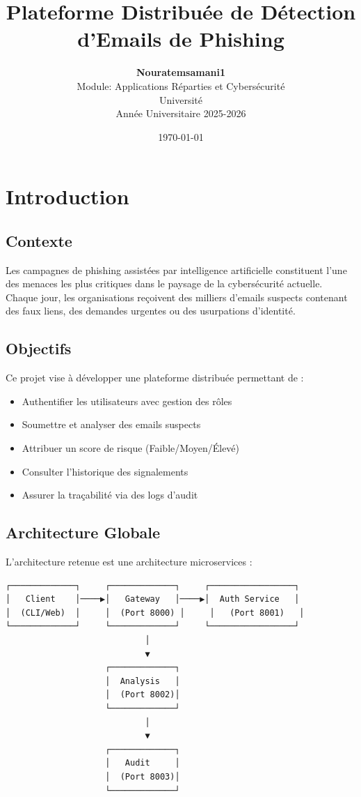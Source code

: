 \documentclass[12pt,a4paper]{article}
\title{
    \vspace{2cm}
    \Huge\textbf{Plateforme Distribuée de Détection}\\ 
    \Huge\textbf{d'Emails de Phishing}
    \vspace{0.5cm}
}
\author{
    \large\textbf{Nouratemsamani1}\\
    \large Module: Applications Réparties et Cybersécurité\\
    \vspace{0.5cm}
    \large Université\\
    \large Année Universitaire 2025-2026
}
\date{\today}
\begin{document}
\maketitle
\thispagestyle{empty}

\newpage
\tableofcontents
\thispagestyle{empty}

\newpage
\setcounter{page}{1}

\section{Introduction}

\subsection{Contexte}
Les campagnes de phishing assistées par intelligence artificielle constituent l'une des menaces les plus critiques dans le paysage de la cybersécurité actuelle. Chaque jour, les organisations reçoivent des milliers d'emails suspects contenant des faux liens, des demandes urgentes ou des usurpations d'identité.

\subsection{Objectifs}
Ce projet vise à développer une plateforme distribuée permettant de :
\begin{itemize}
    \item Authentifier les utilisateurs avec gestion des rôles
    \item Soumettre et analyser des emails suspects
    \item Attribuer un score de risque (Faible/Moyen/Élevé)
    \item Consulter l'historique des signalements
    \item Assurer la traçabilité via des logs d'audit
\end{itemize}

\subsection{Architecture Globale}
L'architecture retenue est une architecture microservices :

\begin{verbatim}
┌─────────────┐     ┌─────────────┐     ┌─────────────────┐
│   Client    │────▶│   Gateway   │────▶│  Auth Service   │
│  (CLI/Web)  │     │  (Port 8000) │     │   (Port 8001)   │
└─────────────┘     └─────────────┘     └─────────────────┘
                            │
                            ▼
                    ┌─────────────┐
                    │  Analysis   │
                    │  (Port 8002)│
                    └─────────────┘
                            │
                            ▼
                    ┌─────────────┐
                    │   Audit     │
                    │  (Port 8003)│
                    └─────────────┘
\end{verbatim}
\end{document}
